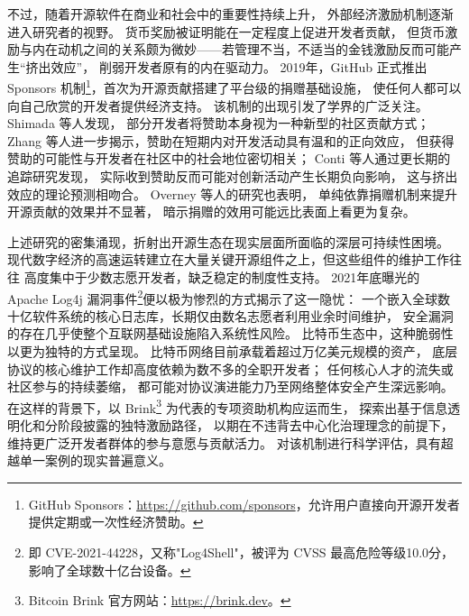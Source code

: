 \documentclass[
    type = master, %
    degree = professional,        %
    decl-page,  %
    twoside,                %
    fontset = fandol %
  ]{njuthesis}
\begin{document}
不过，随着开源软件在商业和社会中的重要性持续上升，
外部经济激励机制逐渐进入研究者的视野。
货币奖励被证明能在一定程度上促进开发者贡献\cite{wang2022monetary}，
但货币激励与内在动机之间的关系颇为微妙——若管理不当，不适当的金钱激励反而可能产生“挤出效应”，
削弱开发者原有的内在驱动力\cite{benabou2003intrinsic,qiao2021mitigating}。
2019年，GitHub 正式推出 Sponsors 机制\footnote{GitHub Sponsors：\url{https://github.com/sponsors}，允许用户直接向开源开发者提供定期或一次性经济赞助。}，首次为开源贡献搭建了平台级的捐赠基础设施，
使任何人都可以向自己欣赏的开发者提供经济支持。
该机制的出现引发了学界的广泛关注。
Shimada 等人\cite{shimada2022github}发现，
部分开发者将赞助本身视为一种新型的社区贡献方式；
Zhang 等人\cite{zhang2022who}进一步揭示，赞助在短期内对开发活动具有温和的正向效应，
但获得赞助的可能性与开发者在社区中的社会地位密切相关；
Conti 等人\cite{conti2023incentivizing}通过更长期的追踪研究发现，
实际收到赞助反而可能对创新活动产生长期负向影响，
这与挤出效应的理论预测相吻合。
Overney 等人\cite{overney2020not}的研究也表明，
单纯依靠捐赠机制来提升开源贡献的效果并不显著，
暗示捐赠的效用可能远比表面上看更为复杂。

上述研究的密集涌现，折射出开源生态在现实层面所面临的深层可持续性困境。
现代数字经济的高速运转建立在大量关键开源组件之上，但这些组件的维护工作往往
高度集中于少数志愿开发者，缺乏稳定的制度性支持。
2021年底曝光的 Apache Log4j 漏洞事件\footnote{即 CVE-2021-44228，又称"Log4Shell"，被评为 CVSS 最高危险等级10.0分，影响了全球数十亿台设备。}便以极为惨烈的方式揭示了这一隐忧：
一个嵌入全球数十亿软件系统的核心日志库，长期仅由数名志愿者利用业余时间维护，
安全漏洞的存在几乎使整个互联网基础设施陷入系统性风险\cite{alami2024sustainability}。
比特币生态中，这种脆弱性以更为独特的方式呈现。
比特币网络目前承载着超过万亿美元规模的资产，
底层协议的核心维护工作却高度依赖为数不多的全职开发者；
任何核心人才的流失或社区参与的持续萎缩，
都可能对协议演进能力乃至网络整体安全产生深远影响。
在这样的背景下，以 Brink\footnote{Bitcoin Brink 官方网站：\url{https://brink.dev}。} 为代表的专项资助机构应运而生，
探索出基于信息透明化和分阶段披露的独特激励路径，
以期在不违背去中心化治理理念的前提下，维持更广泛开发者群体的参与意愿与贡献活力\cite{wu2024governance}。
对该机制进行科学评估，具有超越单一案例的现实普遍意义。
\end{document}
